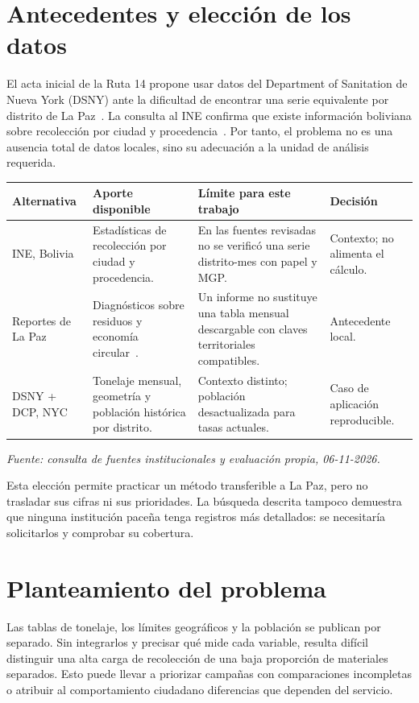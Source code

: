 \documentclass[10pt,a4paper]{article}
\newcommand{\fuente}[1]{{\footnotesize\textit{Fuente: #1.}}}
\begin{document}
\section{Antecedentes y elección de los datos}
El acta inicial de la Ruta 14 propone usar datos del Department of Sanitation de Nueva York (DSNY) ante la dificultad de encontrar una serie equivalente por distrito de La Paz~\cite{acta}. La consulta al INE confirma que existe información boliviana sobre recolección por ciudad y procedencia~\cite{ine}. Por tanto, el problema no es una ausencia total de datos locales, sino su adecuación a la unidad de análisis requerida.

\begin{center}\small
\begin{tabularx}{\linewidth}{@{}p{2.7cm}YYY@{}}
\toprule
\textbf{Alternativa} & \textbf{Aporte disponible} & \textbf{Límite para este trabajo} & \textbf{Decisión} \\\midrule
INE, Bolivia & Estadísticas de recolección por ciudad y procedencia. & En las fuentes revisadas no se verificó una serie distrito-mes con papel y MGP. & Contexto; no alimenta el cálculo. \\
Reportes de La Paz & Diagnósticos sobre residuos y economía circular~\cite{lapaz}. & Un informe no sustituye una tabla mensual descargable con claves territoriales compatibles. & Antecedente local. \\
DSNY + DCP, NYC & Tonelaje mensual, geometría y población histórica por distrito. & Contexto distinto; población desactualizada para tasas actuales. & Caso de aplicación reproducible. \\
\bottomrule
\end{tabularx}\end{center}
\fuente{consulta de fuentes institucionales y evaluación propia, 06-11-2026}

Esta elección permite practicar un método transferible a La Paz, pero no trasladar sus cifras ni sus prioridades. La búsqueda descrita tampoco demuestra que ninguna institución paceña tenga registros más detallados: se necesitaría solicitarlos y comprobar su cobertura.

\section{Planteamiento del problema}
Las tablas de tonelaje, los límites geográficos y la población se publican por separado. Sin integrarlos y precisar qué mide cada variable, resulta difícil distinguir una alta carga de recolección de una baja proporción de materiales separados. Esto puede llevar a priorizar campañas con comparaciones incompletas o atribuir al comportamiento ciudadano diferencias que dependen del servicio.
\end{document}
